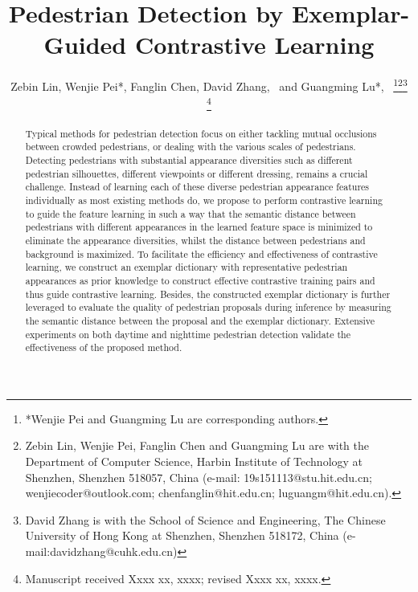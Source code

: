 \documentclass[journal]{IEEEtran}
\begin{document}
\title{Pedestrian Detection by Exemplar-Guided Contrastive Learning}




\author{Zebin Lin,
        Wenjie Pei*,
        Fanglin Chen, 
        David Zhang,~ and
        Guangming  Lu*,~
\thanks{*Wenjie Pei and Guangming Lu are corresponding authors.}\thanks{Zebin Lin, Wenjie Pei, Fanglin Chen and Guangming Lu are with the Department of Computer Science, Harbin Institute of Technology at Shenzhen, Shenzhen 518057, China (e-mail: 19s151113@stu.hit.edu.cn; wenjiecoder@outlook.com; chenfanglin@hit.edu.cn; luguangm@hit.edu.cn).}\thanks{David Zhang is with the School of Science and Engineering, The Chinese
University of Hong Kong at Shenzhen, Shenzhen 518172, China (e-mail:davidzhang@cuhk.edu.cn)}
\thanks{Manuscript received Xxxx xx, xxxx; revised Xxxx xx, xxxx.}}



















\maketitle


\begin{abstract}
Typical methods for pedestrian detection focus on either tackling mutual occlusions between crowded pedestrians, or dealing with the various scales of pedestrians. Detecting pedestrians with substantial appearance diversities such as different pedestrian silhouettes, different viewpoints or different dressing, 
remains a crucial challenge. Instead of learning each of these diverse pedestrian appearance features individually as most existing methods do, we propose to perform contrastive learning to guide the feature learning in such a way that the semantic distance between pedestrians with different appearances in the learned feature space is minimized to eliminate the appearance diversities, whilst the distance between pedestrians and background is maximized. To facilitate the efficiency and effectiveness of contrastive learning, we construct an exemplar dictionary with representative pedestrian appearances as prior knowledge to construct effective contrastive training pairs and thus guide contrastive learning. Besides, the constructed exemplar dictionary is further leveraged to evaluate the quality of pedestrian proposals during inference by measuring the semantic distance between the proposal and the exemplar dictionary. Extensive experiments on both daytime and nighttime pedestrian detection validate the effectiveness of the proposed method.
\end{abstract}
\end{document}
